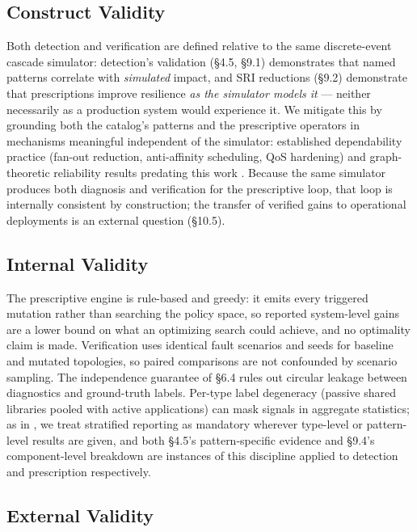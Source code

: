 \documentclass[11pt]{article}
\begin{document}
\subsection{Construct Validity}

Both detection and verification are defined relative to the same discrete-event cascade simulator:
detection's validation (\S4.5, \S9.1) demonstrates that named patterns correlate with \emph{simulated}
impact, and SRI reductions (\S9.2) demonstrate that prescriptions improve resilience \emph{as the
simulator models it} --- neither necessarily as a production system would experience it. We mitigate
this by grounding both the catalog's patterns and the prescriptive operators in mechanisms meaningful
independent of the simulator: established dependability practice (fan-out reduction, anti-affinity
scheduling, QoS hardening) and graph-theoretic reliability results predating this work
\cite{Baldwin2000,Colbourn1987}. Because the same simulator produces both diagnosis and verification
for the prescriptive loop, that loop is internally consistent by construction; the transfer of
verified gains to operational deployments is an external question (\S10.5).

\subsection{Internal Validity}

The prescriptive engine is rule-based and greedy: it emits every triggered mutation rather than
searching the policy space, so reported system-level gains are a lower bound on what an optimizing
search could achieve, and no optimality claim is made. Verification uses identical fault scenarios and
seeds for baseline and mutated topologies, so paired comparisons are not confounded by scenario
sampling. The independence guarantee of \S6.4 rules out circular leakage between diagnostics and
ground-truth labels. Per-type label degeneracy (passive shared libraries pooled with active
applications) can mask signals in aggregate statistics; as in \cite{SaG}, we treat stratified
reporting as mandatory wherever type-level or pattern-level results are given, and both \S4.5's
pattern-specific evidence and \S9.4's component-level breakdown are instances of this discipline
applied to detection and prescription respectively.

\subsection{External Validity}
\end{document}
